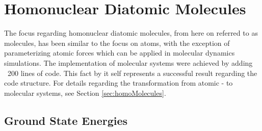 \section{Homonuclear Diatomic Molecules}

The focus regarding homonuclear diatomic molecules, from here on referred to as molecules, has been similar to the focus on atoms, with the exception of parameterizing atomic forces which can be applied in molecular dynamics simulations. The implementation of molecular systems were achieved by adding ~200 lines of code. This fact by it self represents a successful result regarding the code structure. For details regarding the transformation from atomic - to molecular systems, see Section \ref{sec:homoMolecules}.

\subsection{Ground State Energies}
 
